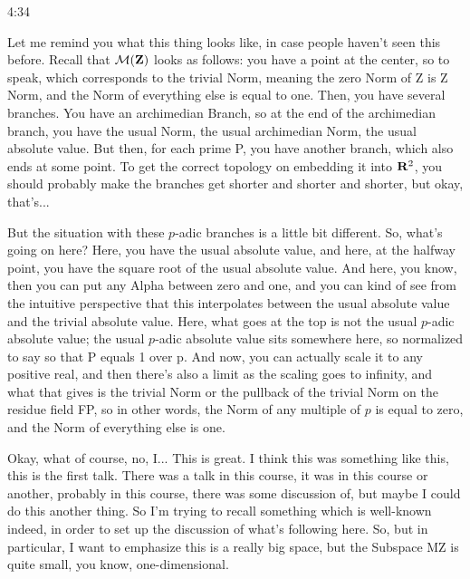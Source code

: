 \begin{unfinished}{4:34}
\begin{example}
\begin{example}
\begin{example}
Let me remind you what this thing looks like, in case people haven't seen this before. Recall that $\mathcal M(\mathbf Z)$ looks as follows: you have a point at the center, so to speak, which corresponds to the trivial Norm, meaning the zero Norm of Z is Z Norm, and the Norm of everything else is equal to one. Then, you have several branches. You have an archimedian Branch, so at the end of the archimedian branch, you have the usual Norm, the usual archimedian Norm, the usual absolute value. But then, for each prime P, you have another branch, which also ends at some point. To get the correct topology on embedding it into $\mathbf R^2$, you should probably make the branches get shorter and shorter and shorter, but okay, that's...

But the situation with these $p$-adic branches is a little bit different. So, what's going on here? Here, you have the usual absolute value, and here, at the halfway point, you have the square root of the usual absolute value. And here, you know, then you can put any Alpha between zero and one, and you can kind of see from the intuitive perspective that this interpolates between the usual absolute value and the trivial absolute value. Here, what goes at the top is not the usual $p$-adic absolute value; the usual $p$-adic absolute value sits somewhere here, so normalized to say so that P equals 1 over p. And now, you can actually scale it to any positive real, and then there's also a limit as the scaling goes to infinity, and what that gives is the trivial Norm or the pullback of the trivial Norm on the residue field FP, so in other words, the Norm of any multiple of $p$ is equal to zero, and the Norm of everything else is one.

Okay, what of course, no, I... This is great. I think this was something like this, this is the first talk. There was a talk in this course, it was in this course or another, probably in this course, there was some discussion of, but maybe I could do this another thing. So I'm trying to recall something which is well-known indeed, in order to set up the discussion of what's following here. So, but in particular, I want to emphasize this is a really big space, but the Subspace MZ is quite small, you know, one-dimensional.


\end{example}
\end{example}
\end{example}
\end{unfinished}
